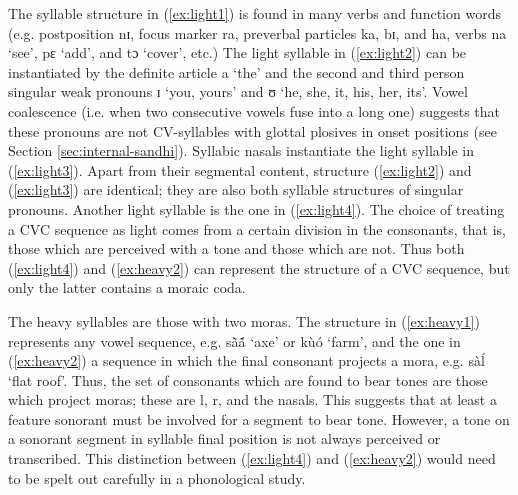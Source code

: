 
 The syllable structure in (\ref{ex:light1}) is  found in many verbs and
function words (e.g. postposition {\sls nɪ}, focus marker {\sls ra},
preverbal particles  {\sls ka},  {\sls bɪ}, and {\sls ha}, verbs {\sls na} 
`see', 
{\sls pɛ} `add',  and  {\sls tɔ} `cover', etc.) The light syllable in
(\ref{ex:light2}) can be instantiated by the definite article {\sls a} `the' and
the
second and third person singular weak pronouns {\sls ɪ} `you, yours'  and  
{\sls 
ʊ}
 `he, she, it, his, her, its'. Vowel
coalescence (i.e. when two consecutive vowels fuse into a long one) suggests 
that these pronouns are not CV-syllables with glottal plosives in onset 
positions  (see Section \ref{sec:internal-sandhi}).  Syllabic nasals instantiate 
the light syllable in (\ref{ex:light3}). Apart from their segmental content, 
structure (\ref{ex:light2}) and (\ref{ex:light3}) are identical; they are also 
both syllable structures of singular pronouns.  Another light syllable is the 
one in (\ref{ex:light4}). The choice of treating a CVC sequence as light comes 
from a certain division in the consonants, that is,  those which are perceived 
with a tone and those which are not. Thus both (\ref{ex:light4}) and 
(\ref{ex:heavy2}) can represent the structure of a CVC sequence, but only the 
latter contains a moraic coda. 

The heavy syllables are those with two moras. The structure  in 
(\ref{ex:heavy1}) represents any vowel sequence, e.g. {\sls sã̀ã́} `axe' or 
{\sls  kùó}  `farm', and the one in (\ref{ex:heavy2}) a sequence in which the 
final consonant projects a mora, e.g.  {\sls sàĺ} `flat  roof'. Thus, the set 
of consonants which are found to bear tones are those which project moras; these 
are {\sls l}, {\sls r},  and the nasals. This suggests  that at least a feature 
{\sc sonorant}  must be involved for a segment to bear tone. However,  a tone on 
a {\sc sonorant} segment in syllable final position is not always perceived or 
transcribed.  This distinction between (\ref{ex:light4}) and (\ref{ex:heavy2})  
would need to be spelt out carefully in a phonological study.


